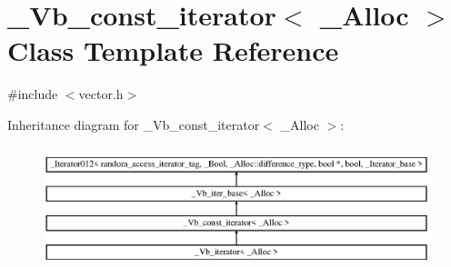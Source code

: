 \hypertarget{class___vb__const__iterator}{\section{\+\_\+\+Vb\+\_\+const\+\_\+iterator$<$ \+\_\+\+Alloc $>$ Class Template Reference}
\label{class___vb__const__iterator}
}


{\ttfamily \#include $<$vector.\+h$>$}

Inheritance diagram for \+\_\+\+Vb\+\_\+const\+\_\+iterator$<$ \+\_\+\+Alloc $>$\+:\begin{figure}[H]
\begin{center}
\leavevmode
\includegraphics[height=3.607085cm]{class___vb__const__iterator}
\end{center}
\end{figure}
